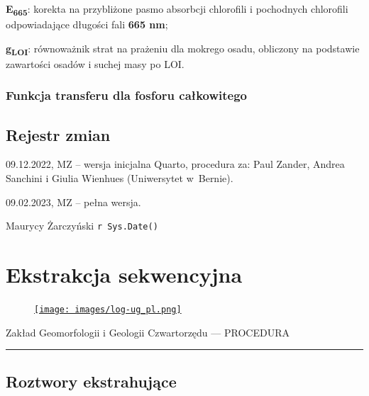 \documentclass[
  letterpaper,
  DIV=11,
  numbers=noendperiod]{scrreprt}
\begin{document}
\textbf{E\textsubscript{665}}: korekta na przybliżone pasmo absorbcji
chlorofili i pochodnych chlorofili odpowiadające długości fali
\textbf{665 nm};

\textbf{g\textsubscript{LOI}}: równoważnik strat na prażeniu dla mokrego
osadu, obliczony na podstawie zawartości osadów i suchej masy po LOI.

\hypertarget{funkcja-transferu-dla-fosforu-caux142kowitego}{%
\subsection{Funkcja transferu dla fosforu
całkowitego}\label{funkcja-transferu-dla-fosforu-caux142kowitego}}

\hypertarget{pagebreak-rejestr-zmian-6}{%
\section{\texorpdfstring{\newpage{}Rejestr
zmian}{Rejestr zmian}}\label{pagebreak-rejestr-zmian-6}}

09.12.2022, MZ -- wersja inicjalna Quarto, procedura za: Paul Zander,
Andrea Sanchini i Giulia Wienhues (Uniwersytet w~Bernie).

09.02.2023, MZ -- pełna wersja.

Maurycy Żarczyński \texttt{r\ Sys.Date()}

\hypertarget{ekstrakcja-sekwencyjna}{%
\chapter{Ekstrakcja sekwencyjna}\label{ekstrakcja-sekwencyjna}}

\begin{figure}

\href{https://geomorfologia.ug.edu.pl}{\texttt{[image: images/log-ug\_pl.png]}}

\end{figure}

Zakład Geomorfologii i Geologii Czwartorzędu --- PROCEDURA

\begin{center}\rule{0.5\linewidth}{0.5pt}\end{center}

\hypertarget{roztwory-ekstrahujux105ce}{%
\section{Roztwory ekstrahujące}\label{roztwory-ekstrahujux105ce}}
\end{document}

